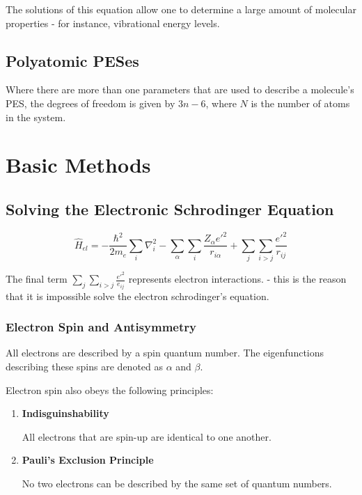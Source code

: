\documentclass[
  letterpaper,
  DIV=11,
  numbers=noendperiod]{scrreprt}
\begin{document}
The solutions of this equation allow one to determine a large amount of
molecular properties - for instance, vibrational energy levels.

\hypertarget{polyatomic-peses}{%
\subsection{Polyatomic PESes}\label{polyatomic-peses}}

Where there are more than one parameters that are used to describe a
molecule's PES, the degrees of freedom is given by \(3n - 6\), where
\(N\) is the number of atoms in the system.

\hypertarget{basic-methods}{%
\section{Basic Methods}\label{basic-methods}}

\hypertarget{solving-the-electronic-schrodinger-equation}{%
\subsection{Solving the Electronic Schrodinger
Equation}\label{solving-the-electronic-schrodinger-equation}}

\begin{equation}
  \hat{H}_{el} = -\frac{\hbar^2}{2m_e}\sum_i\nabla_i^2 - \sum_\alpha\sum_i\frac{Z_\alpha e'^2}{r_{i\alpha}} + \sum_j\sum_{i > j}\frac{e'^2}{r_{ij}}
\end{equation}

The final term \(\displaystyle \sum_j\sum_{i > j}\frac{e'^2}{e_{ij}}\)
represents electron interactions. - this is the reason that it is
impossible solve the electron schrodinger's equation.

\hypertarget{electron-spin-and-antisymmetry}{%
\subsubsection{Electron Spin and
Antisymmetry}\label{electron-spin-and-antisymmetry}}

All electrons are described by a spin quantum number. The eigenfunctions
describing these spins are denoted as \(\alpha\) and \(\beta\).

Electron spin also obeys the following principles:

\begin{enumerate}
\def\labelenumi{\arabic{enumi}.}
\item
  \textbf{Indisguinshability}

  All electrons that are spin-up are identical to one another.
\item
  \textbf{Pauli's Exclusion Principle}

  No two electrons can be described by the same set of quantum numbers.
\end{enumerate}
\end{document}
